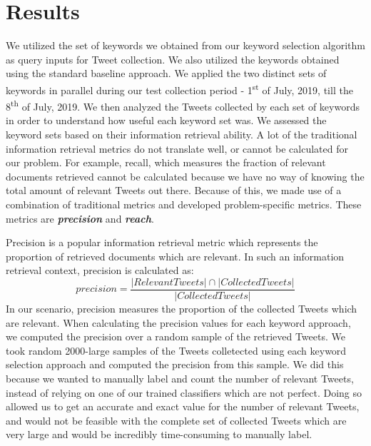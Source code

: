 \documentclass[runningheads]{llncs}
\begin{document}
\section{Results}
We utilized the set of keywords we obtained from our keyword selection algorithm as query inputs for Tweet collection. We also utilized the keywords obtained using the standard baseline approach. We applied the two distinct sets of keywords in parallel during our test collection period -  1\textsuperscript{st} of July, 2019, till the 8\textsuperscript{th} of July, 2019. We then analyzed the Tweets collected by each set of keywords in order to understand how useful each keyword set was. We assessed the keyword sets based on their information retrieval ability. A lot of the traditional information retrieval metrics do not translate well, or cannot be calculated for our problem. For example, recall, which measures the fraction of relevant documents retrieved cannot be calculated because we have no way of knowing the total amount of relevant Tweets out there. Because of this, we made use of a combination of traditional metrics and developed problem-specific metrics. These metrics are \textit{\textbf{precision}} and \textit{\textbf{reach}}.  

Precision is a popular information retrieval metric which represents the proportion of retrieved documents which are relevant. In such an information retrieval context, precision is calculated as:
\begin{equation}
	precision = \frac{|Relevant Tweets| \cap |Collected Tweets|}{|Collected Tweets|}
\end{equation}
In our scenario, precision measures the proportion of the collected Tweets which are relevant. When calculating the precision values for each keyword approach, we computed the precision over a random sample of the retrieved Tweets. We took random 2000-large samples of the Tweets colletected using each keyword selection approach and computed the precision from this sample. We did this because we wanted to manually label and count the number of relevant Tweets, instead of relying on one of our trained classifiers which are not perfect. Doing so allowed us to get an accurate and exact value for the number of relevant Tweets, and would not be feasible with the complete set of collected Tweets which are very large and would be incredibly time-consuming to manually label.
\end{document}
